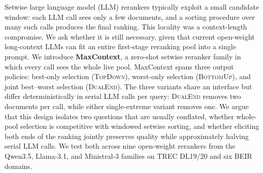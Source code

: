 
Setwise large language model (LLM) rerankers typically exploit a small candidate window: each LLM call sees only a few documents, and a sorting procedure over many such calls produces the final ranking. This locality was a context-length compromise. We ask whether it is still necessary, given that current open-weight long-context LLMs can fit an entire first-stage reranking pool into a single prompt. We introduce \textbf{MaxContext}, a zero-shot setwise reranker family in which every call sees the whole live pool. MaxContext spans three output policies: best-only selection (\textsc{TopDown}), worst-only selection (\textsc{BottomUp}), and joint best--worst selection (\textsc{DualEnd}). The three variants share an interface but differ deterministically in serial LLM calls per query: \textsc{DualEnd} removes two documents per call, while either single-extreme variant removes one. We argue that this design isolates two questions that are usually conflated, whether whole-pool selection is competitive with windowed setwise sorting, and whether eliciting both ends of the ranking jointly preserves quality while approximately halving serial LLM calls. We test both across nine open-weight rerankers from the Qwen3.5, Llama-3.1, and Ministral-3 families on TREC DL19/20 and six BEIR domains.
